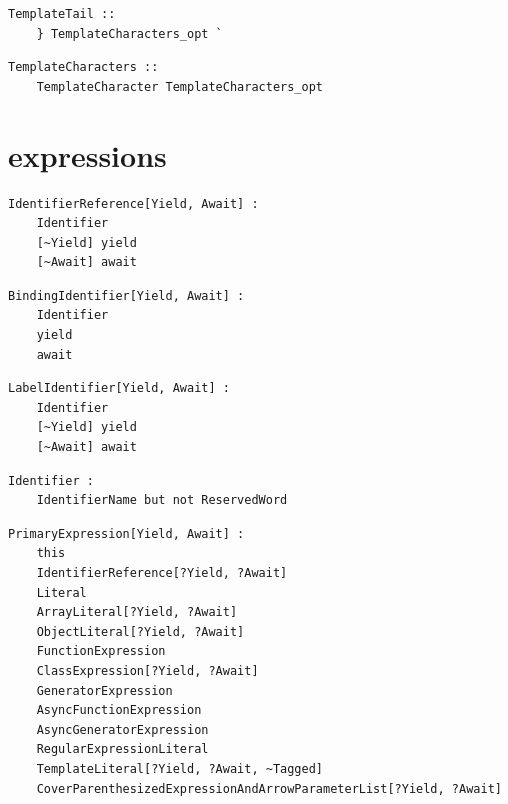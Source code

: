 \noindent\textbf{\texttt{}}\par
\begin{lstlisting}
TemplateTail ::
    } TemplateCharacters_opt `
\end{lstlisting}

\noindent\textbf{\texttt{}}\par
\begin{lstlisting}
TemplateCharacters ::
    TemplateCharacter TemplateCharacters_opt
\end{lstlisting}

\section{expressions}

\noindent\textbf{\texttt{}}\par
\begin{lstlisting}
IdentifierReference[Yield, Await] :
    Identifier
    [~Yield] yield
    [~Await] await
\end{lstlisting}

\noindent\textbf{\texttt{}}\par
\begin{lstlisting}
BindingIdentifier[Yield, Await] :
    Identifier
    yield
    await
\end{lstlisting}

\noindent\textbf{\texttt{}}\par
\begin{lstlisting}
LabelIdentifier[Yield, Await] :
    Identifier
    [~Yield] yield
    [~Await] await
\end{lstlisting}

\noindent\textbf{\texttt{}}\par
\begin{lstlisting}
Identifier :
    IdentifierName but not ReservedWord
\end{lstlisting}

\noindent\textbf{\texttt{}}\par
\begin{lstlisting}
PrimaryExpression[Yield, Await] :
    this
    IdentifierReference[?Yield, ?Await]
    Literal
    ArrayLiteral[?Yield, ?Await]
    ObjectLiteral[?Yield, ?Await]
    FunctionExpression
    ClassExpression[?Yield, ?Await]
    GeneratorExpression
    AsyncFunctionExpression
    AsyncGeneratorExpression
    RegularExpressionLiteral
    TemplateLiteral[?Yield, ?Await, ~Tagged]
    CoverParenthesizedExpressionAndArrowParameterList[?Yield, ?Await]
\end{lstlisting}

